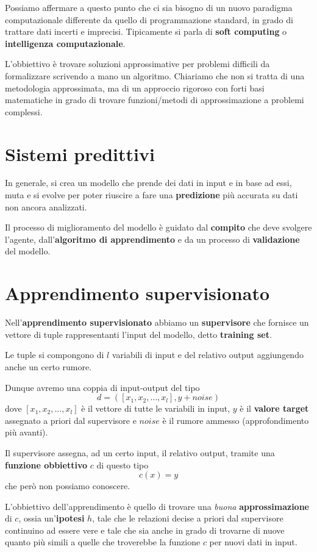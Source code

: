 Possiamo affermare a questo punto che ci sia bisogno di un nuovo paradigma computazionale differente da quello di
programmazione standard, in grado di trattare dati incerti e imprecisi. Tipicamente si parla di \textbf{soft computing} o
\textbf{intelligenza computazionale}.

L'obbiettivo \`e trovare soluzioni approssimative per problemi difficili da formalizzare scrivendo a mano un algoritmo.
Chiariamo che non si tratta di una metodologia approssimata, ma di un approccio rigoroso con forti basi
matematiche in grado di trovare funzioni/metodi di approssimazione a problemi complessi.

\section{Sistemi predittivi}
In generale, si crea un modello che prende dei dati in input e in base ad essi, muta e si evolve per poter riuscire a
fare una \textbf{predizione} pi\`u accurata su dati non ancora analizzati.

Il processo di miglioramento del modello \`e guidato dal \textbf{compito} che deve svolgere l'agente,
dall'\textbf{algoritmo di apprendimento} e da un processo di \textbf{validazione} del modello.

\section{Apprendimento supervisionato}
Nell'\textbf{apprendimento supervisionato} abbiamo un \textbf{supervisore} che fornisce un vettore di tuple rappresentanti
l'input del modello, detto \textbf{training set}.

Le tuple si compongono di $l$ variabili di input e del relativo output aggiungendo anche un certo rumore.

Dunque avremo una coppia di input-output del tipo
\[ d = ([x_1, x_2, \dots, x_l], y + noise) \]
dove $[x_1, x_2, \dots, x_l]$ \`e il vettore di tutte le variabili in input, $y$ \`e il \textbf{valore target} assegnato a
priori dal supervisore e $noise$ \`e il rumore ammesso (approfondimento pi\`u avanti).

Il supervisore assegna, ad un certo input, il relativo output, tramite una \textbf{funzione obbiettivo} $c$ di questo tipo
\[ c(x) = y \]
che per\`o non possiamo conoscere.

L'obbiettivo dell'apprendimento \`e quello di trovare una \emph{buona} \textbf{approssimazione} di $c$, ossia
un'\textbf{ipotesi} $h$, tale che le relazioni decise a priori dal supervisore continuino ad essere vere e tale che sia
anche in grado di trovarne di nuove quanto pi\`u simili a quelle che troverebbe la funzione $c$ per nuovi dati in input.

